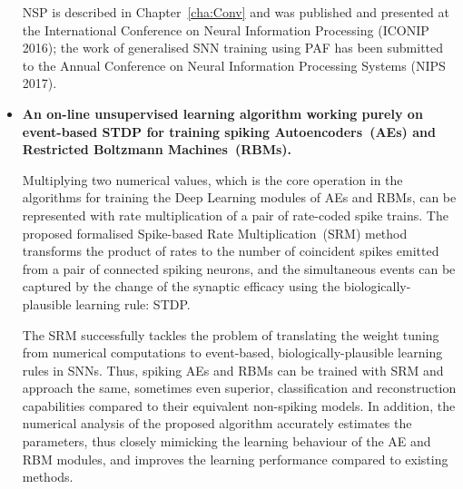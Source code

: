\begin{itemize}

	NSP is described in Chapter~\ref{cha:Conv} and was published and presented at the International Conference on Neural Information Processing (ICONIP 2016);
	the work of generalised SNN training using PAF has been submitted to the Annual Conference on Neural Information Processing Systems (NIPS 2017).

	\item 
	\textbf{An on-line unsupervised learning algorithm working purely on event-based STDP for training spiking Autoencoders~(AEs) and Restricted Boltzmann Machines~(RBMs).}

	Multiplying two numerical values, which is the core operation in the algorithms for training the Deep Learning modules of AEs and RBMs, can be represented with rate multiplication of a pair of rate-coded spike trains.
	The proposed formalised Spike-based Rate Multiplication~(SRM) method transforms the product of rates to the number of coincident spikes emitted from a pair of connected spiking neurons, and the simultaneous events can be captured by the change of the synaptic efficacy using the biologically-plausible learning rule: STDP.

	The SRM successfully tackles the problem of translating the weight tuning from numerical computations to event-based, biologically-plausible learning rules in SNNs.
	\DIFaddbegin {}\DIFaddend Thus, spiking AEs and RBMs can be trained with SRM and approach the same, sometimes even superior, classification and reconstruction capabilities compared to their equivalent non-spiking models.
	In addition, the numerical analysis of the proposed algorithm accurately estimates the parameters, thus closely mimicking the learning behaviour of the AE and RBM modules, and improves the learning performance compared to existing methods.


\end{itemize}

